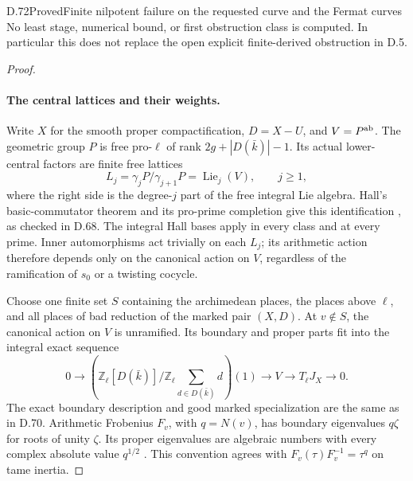 \begin{statement}{D.72}{Proved}{Finite nilpotent failure on the requested curve and the Fermat curves}
No least stage, numerical bound, or first obstruction class is
computed. In particular this does not replace the open explicit
finite-derived obstruction in D.5.
\end{statement}

\begin{proof}
\paragraph{The central lattices and their weights.}
Write \(X\) for the smooth proper compactification, \(D=X-U\),
and \(V=P^{\rm ab}\). The geometric group \(P\) is free
pro-\(\ell\) of rank \(2g+|D(\bar k)|-1\). Its actual
lower-central factors are finite free lattices
\[
 L_j=\gamma_jP/\gamma_{j+1}P
       =\operatorname{Lie}_j(V),\qquad j\ge1,            \tag{D.72.5}
\]
where the right side is the degree-\(j\) part of the free
integral Lie algebra. Hall's basic-commutator theorem and
its pro-prime completion give this identification
\cite[Theorems 5.6 and 6.5, and completion case (iii)]{DE_HallEdmonton},
as checked in D.68. The integral Hall bases apply in every
class and at every prime. Inner automorphisms act trivially
on each \(L_j\); its arithmetic action therefore depends
only on the canonical action on \(V\), regardless of the
ramification of \(s_0\) or a twisting cocycle.

Choose one finite set \(S\) containing the archimedean places,
the places above \(\ell\), and all places of bad reduction
of the marked pair \((X,D)\). At \(v\notin S\), the
canonical action on \(V\) is unramified. Its boundary and
proper parts fit into the integral exact sequence
\[
 0\longrightarrow
 \left(\mathbb Z_\ell[D(\bar k)]/
                   \mathbb Z_\ell{\textstyle\sum_{d\in D(\bar k)}}d\right)(1)
 \longrightarrow V\longrightarrow T_\ell J_X
 \longrightarrow0.                                    \tag{D.72.6}
\]
The exact boundary description and good marked specialization
are the same as in D.70. Arithmetic Frobenius \(F_v\), with
\(q=N(v)\), has boundary eigenvalues \(q\zeta\) for roots
of unity \(\zeta\). Its proper eigenvalues are algebraic
numbers with every complex absolute value \(q^{1/2}\)
\cite[II, Theorem 1.1; IV, Section 3]{fghMilneAV2008}.
This convention agrees with \(F_v(\tau)F_v^{-1}=\tau^q\)
on tame inertia.


\end{proof}
